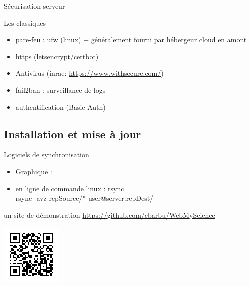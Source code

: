 \documentclass[pdftex,xcolor={table}]{beamer} %
\begin{document}
  \begin{frame}{Sécurisation serveur}
    \begin{block}{Les classiques}
      \begin{itemize}
        \item pare-feu : ufw (linux) + généralement fourni par hébergeur cloud en amont
        \item https (letsencrypt/certbot)
        \item Antivirus (inrae: \url{https://www.withsecure.com/})
        \item fail2ban : surveillance de logs
        \item authentification (Basic Auth)
      \end{itemize}
    \end{block}
  \end{frame}

\subsection{Installation et mise à jour}
     \begin{frame}{Logiciels de synchronisation}
       \begin{itemize}
         \item Graphique : 
         \item en ligne de commande linux : rsync \\
             rsync -avz repSource/* user@server:repDest/
       \end{itemize}
    \end{frame}


  \begin{frame}{un site de démonstration}
    \url{https://github.com/cbarbu/WebMyScience}

    \includegraphics[scale=1]{webmyscience.png} \\
    
  \end{frame}

\end{document}
